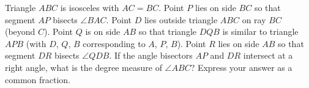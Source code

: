 Triangle $ABC$ is isosceles with $AC=BC$. Point $P$ lies on side $BC$ so that segment $AP$ bisects $\angle BAC$. Point $D$ lies outside triangle $ABC$ on ray $BC$ (beyond $C$). Point $Q$ is on side $AB$ so that triangle $DQB$ is similar to triangle $APB$ (with $D$, $Q$, $B$ corresponding to $A$, $P$, $B$). Point $R$ lies on side $AB$ so that segment $DR$ bisects $\angle QDB$. If the angle bisectors $AP$ and $DR$ intersect at a right angle, what is the degree measure of $\angle ABC$? Express your answer as a common fraction.

